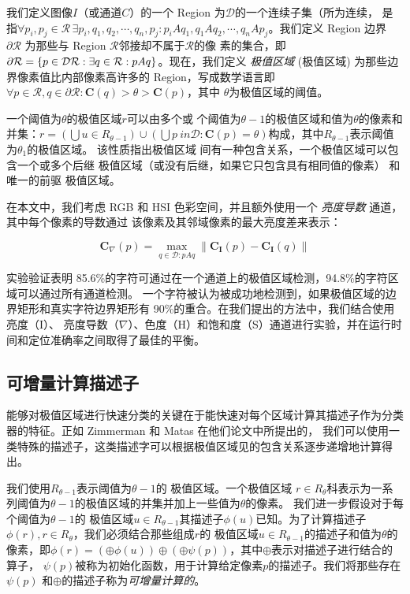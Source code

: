 \documentclass[UTF8]{article}
\begin{document}
我们定义图像$I$（或通道$C$）的一个 Region 为$\mathcal{D}$的一个连续子集（所为连续，
是指$\forall{p_i, p_j \in \mathcal{R}}\, \exists{p_i, q_1, q_2, \cdots, q_n,
  p_j} : p_iAq_1, q_1Aq_2,\cdots,q_nAp_j$。我们定义 Region 边界
$\partial{\mathcal{R}}$ 为那些与 Region $\mathcal{R}$邻接却不属于$\mathcal{R}$的像
素的集合，即$\partial{\mathcal{R}} = \{p \in \mathcal{D} \\ \mathcal{R} :
\exists{q \in \mathcal{R}} : pAq \}$。现在，我们定义 \textit{极值区域} (极值区域)
为那些边界像素值比内部像素高许多的 Region，写成数学语言即$ \forall{p \in
  \mathcal{R}}, q \in \partial{\mathcal{R}} : \mathbf{C}(q) > \theta > \mathbf{C}(p)$，其中
$\theta$为极值区域的阈值。

一个阈值为$\theta$的极值区域$r$可以由多个或
个阈值为$\theta - 1$的极值区域和值为$\theta$的像素和并集：$r = \left( \bigcup{u \in
    R_{\theta-1}} \right) \cup \left( \bigcup{p \ in \mathcal{D} : \mathbf{C}(p)
  = \theta} \right)$构成，其中$R_{\theta-1}$表示阈值为$\theta_1$的极值区域。
该性质指出极值区域 间有一种包含关系，一个极值区域可以包含一个或多个后继 极值区域（或没有后继，如果它只包含具有相同值的像素）
和唯一的前驱 极值区域。

在本文中，我们考虑 RGB 和 HSI 色彩空间，并且额外使用一个 \emph{亮度导数} 通道，其中每个像素的导数通过
该像素及其邻域像素的最大亮度差来表示：

\[
\mathbf{C}_{\nabla}(p) = \max_{q \in \mathcal{D} : pAq}{\| \mathbf{C}_{\mathbf{I}}(p) - \mathbf{C}_{\mathbf{I}}(q) \|}
\]

实验验证表明 85.6\%的字符可通过在一个通道上的极值区域检测，94.8\%的字符区域可以通过所有通道检测。
一个字符被认为被成功地检测到，如果极值区域的边界矩形和真实字符边界矩形有 90\%的重合。在我们提出的方法中，我们结合使用亮度（I）、
亮度导数（$\nabla$）、色度（H）和饱和度（S）通道进行实验，并在运行时间和定位准确率之间取得了最佳的平衡。

\subsection{可增量计算描述子}

能够对极值区域进行快速分类的关键在于能快速对每个区域计算其描述子作为分类器的特征。正如 Zimmerman 和 Matas 在他们论文中所提出的，
我们可以使用一类特殊的描述子，这类描述字可以根据极值区域见的包含关系逐步递增地计算得出。

我们使用$R_{\theta-1}$表示阈值为$\theta-1$的 极值区域。一个极值区域 $r \in R_{\theta}$科表示为一系列阈值为$\theta-1$的极值区域的并集并加上一些值为$\theta$的像素。
我们进一步假设对于每个阈值为$\theta-1$的 极值区域$u \in R_{\theta-1}$其描述子$\phi(u)$已知。为了计算描述子$\phi(r), r \in R_{\theta}$，我们必须结合那些组成$r$的
极值区域$u \in R_{\theta-1}$的描述子和值为$\theta$的像素，即$\phi(r) = \left( \oplus{\phi(u)} \right) \oplus \left( \oplus{\psi(p)} \right)$，其中$\oplus$表示对描述子进行结合的算子，
$\psi(p)$被称为初始化函数，用于计算给定像素$p$的描述子。我们将那些存在$\psi(p)$
和$\oplus$的描述子称为\textit{可增量计算的}。
\end{document}
